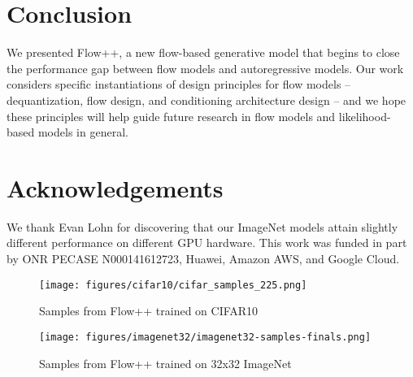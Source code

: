 \documentclass{article}
\begin{document}
\section{Conclusion}

We presented Flow++, a new flow-based generative model that begins to close the performance gap between flow models and autoregressive models. Our work considers specific instantiations of design principles for flow models -- dequantization, flow design, and conditioning architecture design -- and we hope these principles will help guide future research in flow models and likelihood-based models in general. 


\section*{Acknowledgements}
We thank Evan Lohn for discovering that our ImageNet models attain slightly different performance on different GPU hardware.
This work was funded in part by ONR PECASE N000141612723, Huawei, Amazon AWS, and Google Cloud.






\newpage

\begin{figure*}[]
\begin{center}
\texttt{[image: figures/cifar10/cifar\_samples\_225.png]}
\end{center}
\caption{Samples from Flow++ trained on CIFAR10}
\end{figure*}


\begin{figure*}[]
\begin{center}
\texttt{[image: figures/imagenet32/imagenet32-samples-finals.png]}
\end{center}
\caption{Samples from Flow++ trained on 32x32 ImageNet}
\end{figure*}
\end{document}
